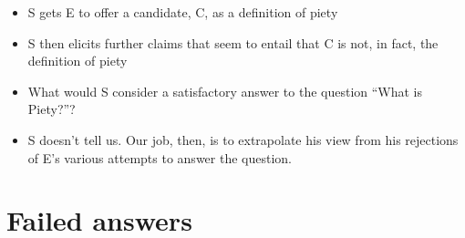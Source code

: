 \documentclass[oneside]{article}
\begin{document}
\begin{itemize}
\item S gets E to offer a candidate, C, as a definition of piety
\item S then elicits further claims that seem to entail that C is not, in fact, the definition of piety
\item What would S consider a satisfactory answer to the question ``What is Piety?''?
\item S doesn't tell us. Our job, then, is to extrapolate his view from his rejections of E's various attempts to answer the question.
\end{itemize}

\section*{Failed answers}
\end{document}
